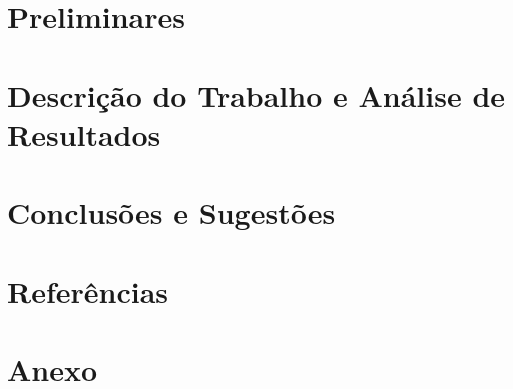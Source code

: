 \documentclass[11pt, a4paper, titlepage]{article}
\begin{document}
\section[Preliminares]{\LARGE Preliminares} \label{sec2}


\section[Descrição do Trabalho e Análise de Resultados]{\LARGE Descrição do Trabalho e Análise de Resultados} \label{sec3}


\section[Conclusões e Sugestões]{\LARGE Conclusões e Sugestões} \label{sec4}


\section[Referências]{\LARGE Referências} \label{src5}


\appendix %
\section[Anexo]{\LARGE Anexo} \label{anexo}



\end{document}
